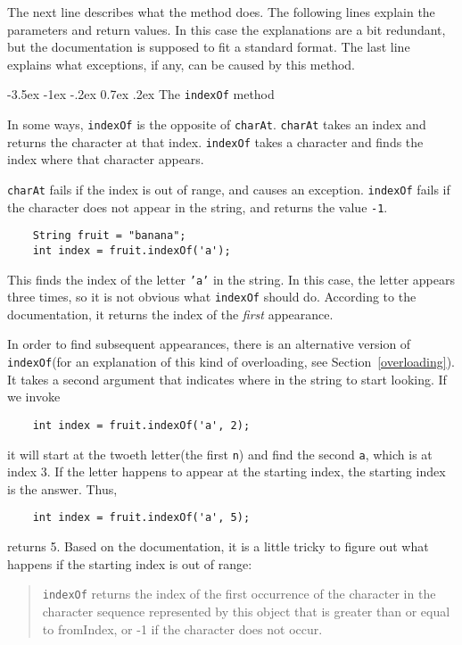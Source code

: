 \documentclass{book}
\makeatletter
\renewcommand{\section}{\@startsection 
    {section} {1} {0mm}%
    {-3.5ex \@plus -1ex \@minus -.2ex}%
    {0.7ex \@plus.2ex}%
    {\normalfont\Large\bfseries}}
\makeatother
\begin{document}
The next line describes what the method does.  The following
lines explain the parameters and return values.  In this case
the explanations are a bit redundant, but the documentation is
supposed to fit a standard format.  The last line explains what
exceptions, if any, can be caused by this method.

\section{The {\tt indexOf} method}

In some ways, {\tt indexOf} is the opposite of {\tt charAt}.
{\tt charAt} takes an index and returns the character at that
index.  {\tt indexOf} takes a character and finds the index
where that character appears.

{\tt charAt} fails if the index is out of range, and causes an
exception.  {\tt indexOf} fails if the character does not appear in
the string, and returns the value {\tt -1}.

\begin{verbatim}
    String fruit = "banana";
    int index = fruit.indexOf('a');
\end{verbatim}
%
This finds the index of the letter {\tt 'a'} in the string.
In this case, the letter appears three times, so it is not
obvious what {\tt indexOf} should do.  According to the
documentation, it returns the index of the {\em first} appearance.

In order to find subsequent appearances, there is an alternative
version of {\tt indexOf}(for an explanation of this kind
of overloading, see Section~\ref{overloading}).  It takes a
second argument that indicates where in the string to start
looking.  If we invoke

\begin{verbatim}
    int index = fruit.indexOf('a', 2);
\end{verbatim}
%
it will start at the twoeth letter(the first {\tt n}) and find
the second {\tt a}, which is at index 3.  If the letter happens
to appear at the starting index, the starting index is the
answer.  Thus,

\begin{verbatim}
    int index = fruit.indexOf('a', 5);
\end{verbatim}
%
returns 5.  Based on the documentation, it is a little tricky
to figure out what happens if the starting index is out
of range:

\begin{quote}
{\tt indexOf} returns the index of the first occurrence of the
character in the character sequence represented by this object that is
greater than or equal to fromIndex, or -1 if the character does not
occur.
\end{quote}
\end{document}
